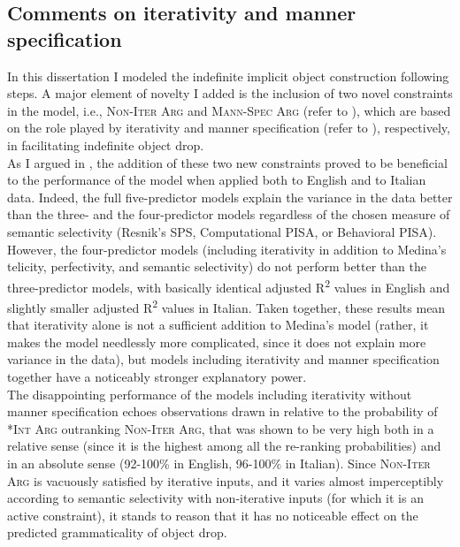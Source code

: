\subsection{Comments on iterativity and manner specification}

In this dissertation I modeled the indefinite implicit object construction following  steps. A major element of novelty I added is the inclusion of two novel constraints in the model, i.e., \textsc{Non-Iter Arg} and \textsc{Mann-Spec Arg} (refer to ), which are based on the role played by iterativity and manner specification (refer to ), respectively, in facilitating indefinite object drop.\\
As I argued in , the addition of these two new constraints proved to be beneficial to the performance of the model when applied both to English and to Italian data. Indeed, the full five-predictor models explain the variance in the data better than the three- and the four-predictor models regardless of the chosen measure of semantic selectivity (Resnik's SPS, Computational PISA, or Behavioral PISA). However, the four-predictor models (including iterativity in addition to Medina's telicity, perfectivity, and semantic selectivity) do not perform better than the three-predictor models, with basically identical adjusted R\textsuperscript{2} values in English and slightly smaller adjusted R\textsuperscript{2} values in Italian. Taken together, these results mean that iterativity alone is not a sufficient addition to Medina's model (rather, it makes the model needlessly more complicated, since it does not explain more variance in the data), but models including iterativity and manner specification together have a noticeably stronger explanatory power.\\
The disappointing performance of the models including iterativity without manner specification echoes observations drawn in  relative to the probability of \textsc{*Int Arg} outranking \textsc{Non-Iter Arg}, that was shown to be very high both in a relative sense (since it is the highest among all the re-ranking probabilities) and in an absolute sense (92-100\% in English, 96-100\% in Italian). Since \textsc{Non-Iter Arg} is vacuously satisfied by iterative inputs, and it varies almost imperceptibly according to semantic selectivity with non-iterative inputs (for which it is an active constraint), it stands to reason that it has no noticeable effect on the predicted grammaticality of object drop.\\
